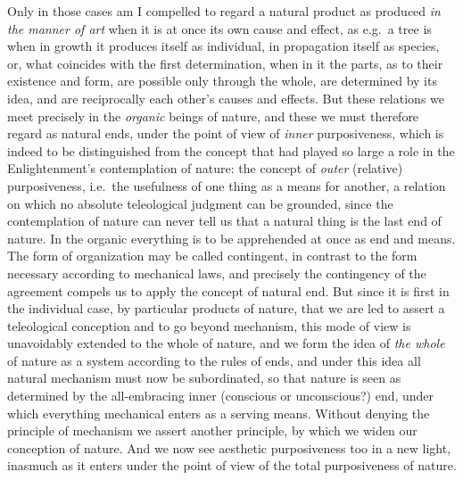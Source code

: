 Only in those cases am I compelled to regard a natural product as
produced \emph{in the manner of art} when it is at once its own cause
and effect, as e.g.\ a tree is when in growth it produces itself as
individual, in propagation itself as species, or, what coincides with
the first determination, when in it the parts, as to their existence
and form, are possible only through the whole, are determined by its
idea, and are reciprocally each other's causes and effects. But these
relations we meet precisely in the \emph{organic} beings of nature, and
these we must therefore regard as natural ends, under the point of view
of \emph{inner} purposiveness, which is indeed to be distinguished from
the concept that had played so large a role in the Enlightenment's
contemplation of nature: the concept of \emph{outer} (relative)
purposiveness, i.e.\ the usefulness of one thing as a means for
another, a relation on which no absolute teleological judgment can be
grounded, since the contemplation of nature can never tell us that a
natural thing is the last end of nature. In the organic everything is
to be apprehended at once as end and means. The form of organization
may be called contingent, in contrast to the form necessary according
to mechanical laws, and precisely the contingency of the agreement
compels us to apply the concept of natural end. But since it is first
in the individual case, by particular products of nature, that we are
led to assert a teleological conception and to go beyond mechanism,
this mode of view is unavoidably extended to the whole of nature, and
we form the idea of \emph{the whole} of nature as a system according to
the rules of ends, and under this idea all natural mechanism must now
be subordinated, so that nature is seen as determined by the
all-embracing inner (conscious or unconscious?) end, under
which everything mechanical enters as a serving means. Without denying
the principle of mechanism we assert another principle, by which we
widen our conception of nature. And we now see aesthetic purposiveness
too in a new light, inasmuch as it enters under the point of view of
the total purposiveness of nature.

